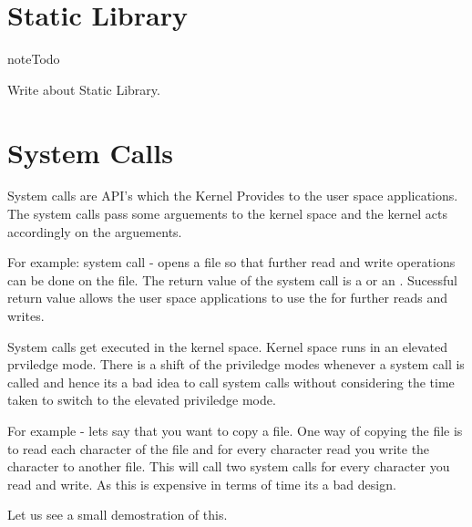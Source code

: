 \documentclass[letterpaper,10pt,english]{sphinxmanual}
\begin{document}
\section{Static Library}
\label{\detokenize{02_system_calls:static-library}}
\begin{sphinxadmonition}{note}{Todo}

Write about Static Library.
\end{sphinxadmonition}


\section{System Calls}
\label{\detokenize{02_system_calls:system-calls}}
System calls are API's which the Kernel Provides to the user space
applications. The system calls pass some arguements to the kernel space and the
kernel acts accordingly on the arguements.

For example:  system call - opens a file so that further read and
write operations can be done on the file. The return value of the 
system call is a  or an . Sucessful return value
allows the user space applications to use the  for further reads
and writes.

System calls get executed in the kernel space. Kernel space runs in an elevated
prviledge mode. There is a shift of the priviledge modes whenever a system call
is called and hence its a bad idea to call system calls without considering the
time taken to switch to the elevated priviledge mode.

For example - lets say that you want to copy a file. One way of copying the file
is to read each character of the file and for every character read you write the
character to another file. This will call two system calls for every
character you read and write. As this is expensive in terms of time its a bad
design.

Let us see a small demostration of this.
\end{document}
